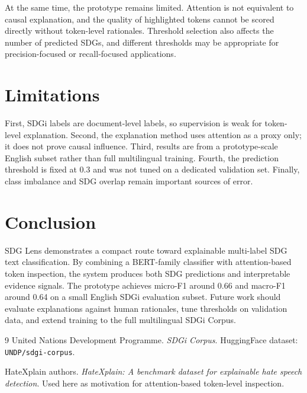\documentclass[10pt]{article}
\begin{document}
At the same time, the prototype remains limited. Attention is not equivalent to
causal explanation, and the quality of highlighted tokens cannot be scored
directly without token-level rationales. Threshold selection also affects the
number of predicted SDGs, and different thresholds may be appropriate for
precision-focused or recall-focused applications.

\section{Limitations}
First, SDGi labels are document-level labels, so supervision is weak for
token-level explanation. Second, the explanation method uses attention as a
proxy only; it does not prove causal influence. Third, results are from a
prototype-scale English subset rather than full multilingual training. Fourth,
the prediction threshold is fixed at 0.3 and was not tuned on a dedicated
validation set. Finally, class imbalance and SDG overlap remain important
sources of error.

\section{Conclusion}
SDG Lens demonstrates a compact route toward explainable multi-label SDG text
classification. By combining a BERT-family classifier with attention-based
token inspection, the system produces both SDG predictions and interpretable
evidence signals. The prototype achieves micro-F1 around 0.66 and macro-F1
around 0.64 on a small English SDGi evaluation subset. Future work should
evaluate explanations against human rationales, tune thresholds on validation
data, and extend training to the full multilingual SDGi Corpus.

\begin{thebibliography}{9}
United Nations Development Programme. \emph{SDGi Corpus}. HuggingFace dataset:
\texttt{UNDP/sdgi-corpus}.

HateXplain authors. \emph{HateXplain: A benchmark dataset for explainable hate
speech detection}. Used here as motivation for attention-based token-level
inspection.
\end{thebibliography}
\end{document}
